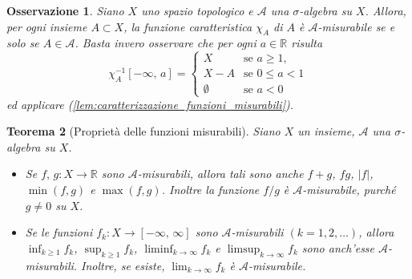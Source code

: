 \documentclass[a4paper,10pt,openright,oneside]{book}
\theoremstyle{theoremstyle}
\newtheorem{teorema}{Teorema}[section]
\theoremstyle{theoremstylewoheader}
\theoremstyle{theoremstyle}
\newtheorem{osservazione}[teorema]{Osservazione}
\theoremstyle{proofsecstyle}
\theoremstyle{nonumberplain}
\renewcommand{\AA}{\ensuremath{\mathcal{A}}}
\newcommand{\RR}{\ensuremath{\mathbb{R}}}
\newcommand{\abs}[1]{\ensuremath{\lvert #1 \rvert}}
\begin{document}
\begin{osservazione}
\label{oss:proprieta_funzione_caratteristica}
Siano $X$ uno spazio topologico e $\AA$ una $\sigma$-algebra su $X$. Allora, per ogni insieme $A \subset X$, la \emph{funzione caratteristica} $\chi_A$ di $A$ è $\AA$-misurabile se e solo se $A \in \AA$. Basta invero osservare che per ogni $a \in \RR$ risulta
\[
\chi_A^{-1}[-\infty,\, a] = \begin{cases}
X & \text{se $a \ge 1$,}\\
X-A & \text{se $0 \le a < 1$}\\
\emptyset & \text{se $a < 0$}
\end{cases}
\]
ed applicare (\ref{lem:caratterizzazione_funzioni_misurabili}).
\end{osservazione}

\begin{teorema}[Proprietà delle funzioni misurabili]
\label{thm:proprieta_funzioni_misurabili}
Siano $X$ un insieme, $\AA$ una $\sigma$-algebra su $X$.
\begin{itemize}
\item[(i)] Se $f,\, g : X \rightarrow \RR$ sono $\AA$-misurabili, allora tali sono anche $f+g$, $fg$, $\abs{f}$, $\min(f,g)$ e $\max(f,g)$. Inoltre la funzione $f/g$ è $\AA$-misurabile, purché $g \ne 0$ su $X$.
\item[(ii)] Se le funzioni $f_k : X \rightarrow [-\infty,\, \infty]$ sono $\AA$-misurabili $(k = 1, 2, \ldots)$, allora $\inf_{k \ge 1} f_k$, $\sup_{k \ge 1} f_k$, $\liminf_{k \to \infty} f_k$ e $\limsup_{k \to \infty} f_k$ sono anch'esse $\AA$-misurabili. Inoltre, se esiste, $\lim_{k \to \infty} f_k$ è $\AA$-misurabile.
\end{itemize}
\end{teorema}
\end{document}
